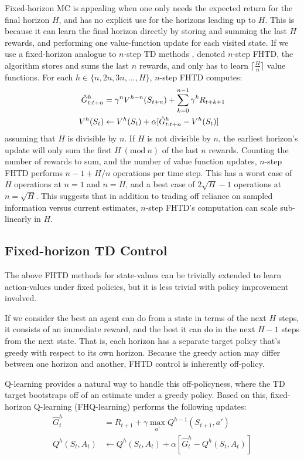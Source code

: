 \documentclass[letterpaper]{article} %
\begin{document}
Fixed-horizon MC is appealing when one only needs the expected return for the final horizon $H$, and has no explicit use for the horizons leading up to $H$. This is because it can learn the final horizon directly by storing and summing the last $H$ rewards, and performing one value-function update for each visited state. If we use a fixed-horizon analogue to $n$-step TD methods \cite{rlbook2018}, denoted $n$-step FHTD, the algorithm stores and sums the last $n$ rewards, and only has to learn $\lceil\frac{H}{n}\rceil$ value functions. For each $h \in \{n, 2n, 3n, ..., H\}$, $n$-step FHTD computes:
\begin{align}\small
\hat{G}^h_{t:t+n} &= \gamma^n V^{h - n}(S_{t+n}) + \sum^{n-1}_{k=0}{\gamma^k R_{t+k+1}}
\label{eqn:nstepfhtdtarget} \\
V^h(S_t) &\leftarrow V^h(S_t) + \alpha [\hat{G}^h_{t:t+n} - V^h(S_t)]
\label{eqn:nstepfhtdupdate}
\end{align}
assuming that $H$ is divisible by $n$. If $H$ is not divisible by $n$, the earliest horizon's update will only sum the first $H\ (\mathrm{mod}\ n)$ of the last $n$ rewards. Counting the number of rewards to sum, and the number of value function updates, $n$-step FHTD performs $n - 1 + H/n$ operations per time step. This has a worst case of $H$ operations at $n = 1$ and $n = H$, and a best case of $2\sqrt{H} - 1$ operations at $n = \sqrt{H}$. This suggests that in addition to trading off reliance on sampled information versus current estimates, $n$-step FHTD's computation can scale sub-linearly in $H$.

\subsection{Fixed-horizon TD Control}

The above FHTD methods for state-values can be trivially extended to learn action-values under fixed policies, but it is less trivial with policy improvement involved.

If we consider the best an agent can do from a state in terms of the next $H$ steps, it consists of an immediate reward, and the best it can do in the next $H - 1$ steps from the next state. That is, each horizon has a separate target policy that's greedy with respect to its own horizon. Because the greedy action may differ between one horizon and another, FHTD control is inherently off-policy.

Q-learning provides a natural way to handle this off-policyness, where the TD target bootstraps off of an estimate under a greedy policy. Based on this, fixed-horizon Q-learning (FHQ-learning) performs the following updates:
\begin{align}
\hat{G}^h_t &= R_{t+1} + \gamma \max_{a'}{Q^{h-1}(S_{t+1}, a')}
\label{eqn:onestepfhqltarget} \\
Q^h(S_t, A_t) &\leftarrow Q^h(S_t, A_t) + \alpha [\hat{G}^h_t - Q^h(S_t, A_t)]
\label{eqn:onestepfhqlupdate}
\end{align}
\end{document}

